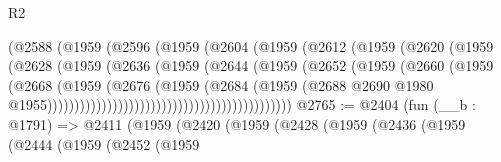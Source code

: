 \begin{lexlean}{R2}
\begin{coremodule}
                                        (@2588
                                          (@1959
                                            (@2596
                                              (@1959
                                                (@2604
                                                  (@1959
                                                    (@2612
                                                      (@1959
                                                        (@2620
                                                          (@1959
                                                            (@2628
                                                              (@1959
                                                                (@2636
                                                                  (@1959
                                                                    (@2644
                                                                      (@1959
                                                                        (@2652
                                                                          (@1959
                                                                            (@2660
                                                                              (@1959
                                                                                (@2668
                                                                                  (@1959
                                                                                    (@2676
                                                                                      (@1959
                                                                                        (@2684
                                                                                          (@1959
                                                                                            (@2688
                                                                                              @2690
                                                                                              @1980
                                                                                              @1955)))))))))))))))))))))))))))))))))))))))))))))
@2765 := @2404
    (fun (__b : @1791) =>
    @2411
      (@1959
        (@2420
          (@1959
            (@2428
              (@1959
                (@2436
                  (@1959
                    (@2444
                      (@1959
                        (@2452
                          (@1959

\end{coremodule}
\end{lexlean}
